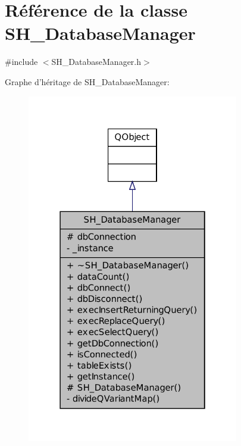 \hypertarget{classSH__DatabaseManager}{\section{Référence de la classe S\-H\-\_\-\-Database\-Manager}
\label{classSH__DatabaseManager}
}


{\ttfamily \#include $<$S\-H\-\_\-\-Database\-Manager.\-h$>$}



Graphe d'héritage de S\-H\-\_\-\-Database\-Manager\-:
\nopagebreak
\begin{figure}[H]
\begin{center}
\leavevmode
\includegraphics[width=262pt]{classSH__DatabaseManager__inherit__graph}
\end{center}
\end{figure}


